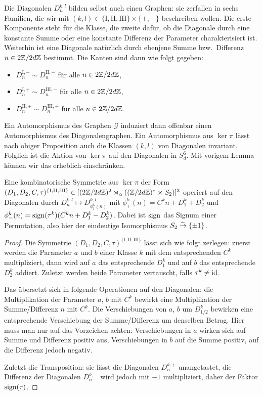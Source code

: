 Die Diagonalen $D_n^{k,l}$ bilden selbst auch einen Graphen: sie zerfallen in sechs Familien, die wir mit $(k,l) \in \{\mathrm{I}, \mathrm{II}, \mathrm{III}\} \times \{+,-\}$ beschreiben wollen. Die erste Komponente steht für die Klasse, die zweite dafür, ob die Diagonale durch eine konstante Summe oder eine konstante Differenz der Parameter charakterisiert ist. Weiterhin ist eine Diagonale natürlich durch ebenjene Summe bzw.~Differenz $n \in 2\Zmod 2dZ$ bestimmt. Die Kanten sind dann wie folgt gegeben:
\begin{itemize}
\item $D_n^{\mathrm{I},-} \sim D_n^{\mathrm{II},-}$ für alle $n \in 2\Zmod 2dZ$,
\item $D_n^{\mathrm{I},+} \sim D_n^{\mathrm{III},-}$ für alle $n \in 2\Zmod 2dZ$,
\item $D_n^{\mathrm{II},+} \sim D_n^{\mathrm{III},+}$ für alle $n \in 2\Zmod 2dZ$.
\end{itemize}
Ein Automorphismus des Graphen $\mathcal G$ induziert dann offenbar einen Automorphismus des Diagonalengraphen. Ein Automorphismus aus $\ker \pi$ lässt nach obiger Proposition auch die Klassen $(k,l)$ von Diagonalen invariant. Folglich ist die Aktion von $\ker \pi$ auf den Diagonalen in $S_d^6$. Mit vorigem Lemma können wir das erheblich einschränken.

\begin{lemma}
Eine kombinatorische Symmetrie aus $\ker \pi$ der Form $(D_1, D_2, C, \tau)^{\{\mathrm{I, II, III}\}} \in [(2\Zmod 2dZ)^2 \rtimes_\alpha ((\Zmod 2dZ)^* \times S_2)]^3$ operiert auf den Diagonalen durch $D_n^{k,l} \mapsto D_{\phi_l^k(n)}^{k,l}$ mit $\phi_+^k(n) = C^k n + D_1^k + D_2^k$ und $\phi_-^k(n) = \operatorname{sign}(\tau^k)(C^k n + D_1^k - D_2^k)$. Dabei ist $\operatorname{sign}$ das Signum einer Permutation, also hier der eindeutige Isomorphismus $S_2 \overrel\to^\sim \{\pm 1\}$.
\end{lemma}
\begin{proof}
Die Symmetrie $(D_1, D_2, C, \tau)^{\{\mathrm{I, II, III}\}}$ lässt sich wie folgt zerlegen: zuerst werden die Parameter $a$ und $b$ einer Klasse $k$ mit dem entsprechenden $C^k$ multipliziert, dann wird auf $a$ das entsprechende $D_1^k$ und auf $b$ das entsprechende $D_2^k$ addiert. Zuletzt werden beide Parameter vertauscht, falls $\tau^k \neq \operatorname{id}$.

Das übersetzt sich in folgende Operationen auf den Diagonalen: die Multiplikation der Parameter $a$, $b$ mit $C^k$ bewirkt eine Multiplikation der Summe/Differenz $n$ mit $C^k$. Die Verschiebungen von $a$, $b$ um $D_{1/2}^k$ bewirken eine entsprechende Verschiebung der Summe/Differenz um denselben Betrag. Hier muss man nur auf das Vorzeichen achten: Verschiebungen in $a$ wirken sich auf Summe und Differenz positiv aus, Verschiebungen in $b$ auf die Summe positiv, auf die Differenz jedoch negativ.

Zuletzt die Transposition: sie lässt die Diagonalen $D_n^{k,+}$ unangetastet, die Differenz der Diagonalen $D_n^{k,-}$ wird jedoch mit $-1$ multipliziert, daher der Faktor $\operatorname{sign}(\tau)$.
\end{proof}

